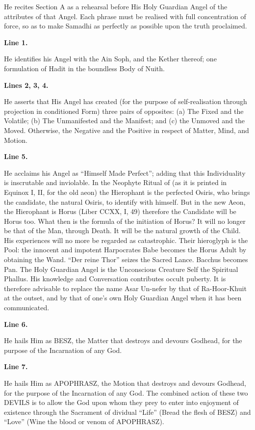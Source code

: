 He recites Section A as a rehearsal before His Holy Guardian Angel of the attributes of that Angel. Each phrase must be realised with full concentration of force, so as to make Samadhi as perfectly as possible upon the truth proclaimed.


\textbf{Line 1.}


He identifies his Angel with the Ain Soph, and the Kether thereof; one formulation of Hadit in the boundless Body of Nuith.


\textbf{Lines 2, 3, 4.}


He asserts that His Angel has created (for the purpose of self-realisation through projection in conditioned Form) three pairs of opposites: (a) The Fixed and the Volatile; (b) The Unmanifested and the Manifest; and (c) the Unmoved and the Moved. Otherwise, the Negative and the Positive in respect of Matter, Mind, and Motion.


\textbf{Line 5.}


He acclaims his Angel as \enquote{Himself Made Perfect}; adding that this Individuality is inscrutable and inviolable. In the Neophyte Ritual of \GD{} (as it is printed in Equinox I, II, for the old aeon) the Hierophant is the perfected Osiris, who brings the candidate, the natural Osiris, to identify with himself. But in the new Aeon, the Hierophant is Horus (Liber CCXX, I, 49) therefore the Candidate will be Horus too. What then is the formula of the initiation of Horus? It will no longer be that of the Man, through Death. It will be the natural growth of the Child. His experiences will no more be regarded as catastrophic. Their hieroglyph is the Pool: the innocent and impotent Harpocrates Babe becomes the Horus Adult by obtaining the Wand. \enquote{Der reine Thor} seizes the Sacred Lance. Bacchus becomes Pan. The Holy Guardian Angel is the Unconscious Creature Self \textemdash{} the Spiritual Phallus. His knowledge and Conversation contributes occult puberty. It is therefore advisable to replace the name Asar Un-nefer by that of Ra-Hoor-Khuit at the outset, and by that of one's own Holy Guardian Angel when it has been communicated.


\textbf{Line 6.}


He hails Him as BESZ, the Matter that destroys and devours Godhead, for the purpose of the Incarnation of any God.


\textbf{Line 7.}


He hails Him as APOPHRASZ, the Motion that destroys and devours Godhead, for the purpose of the Incarnation of any God. The combined action of these two DEVILS is to allow the God upon whom they prey to enter into enjoyment of existence through the Sacrament of dividual \enquote{Life} (Bread \textemdash{} the flesh of BESZ) and \enquote{Love} (Wine \textemdash{} the blood or venom of APOPHRASZ).


